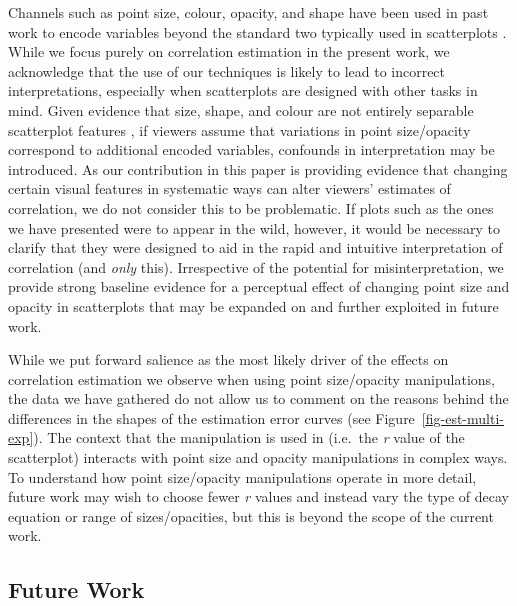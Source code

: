 \documentclass[sigconf]{acmart}
\begin{document}
Channels such as point size, colour, opacity, and shape have been used
in past work to encode variables beyond the standard two typically used
in scatterplots \citep{hong_2021, smart_2019}. While we focus purely on
correlation estimation in the present work, we acknowledge that the use
of our techniques is likely to lead to incorrect interpretations,
especially when scatterplots are designed with other tasks in mind.
Given evidence that size, shape, and colour are not entirely separable
scatterplot features \citep{smart_2019}, if viewers assume that
variations in point size/opacity correspond to additional encoded
variables, confounds in interpretation may be introduced. As our
contribution in this paper is providing evidence that changing certain
visual features in systematic ways can alter viewers' estimates of
correlation, we do not consider this to be problematic. If plots such as
the ones we have presented were to appear in the wild, however, it would
be necessary to clarify that they were designed to aid in the rapid and
intuitive interpretation of correlation (and \emph{only} this).
Irrespective of the potential for misinterpretation, we provide strong
baseline evidence for a perceptual effect of changing point size and
opacity in scatterplots that may be expanded on and further exploited in
future work.

While we put forward salience as the most likely driver of the effects
on correlation estimation we observe when using point size/opacity
manipulations, the data we have gathered do not allow us to comment on
the reasons behind the differences in the shapes of the estimation error
curves (see Figure~\ref{fig-est-multi-exp}). The context that the
manipulation is used in (i.e.~the \emph{r} value of the scatterplot)
interacts with point size and opacity manipulations in complex ways. To
understand how point size/opacity manipulations operate in more detail,
future work may wish to choose fewer \emph{r} values and instead vary
the type of decay equation or range of sizes/opacities, but this is
beyond the scope of the current work.

\hypertarget{sec-future-work}{%
\subsection{Future Work}\label{sec-future-work}}
\end{document}
